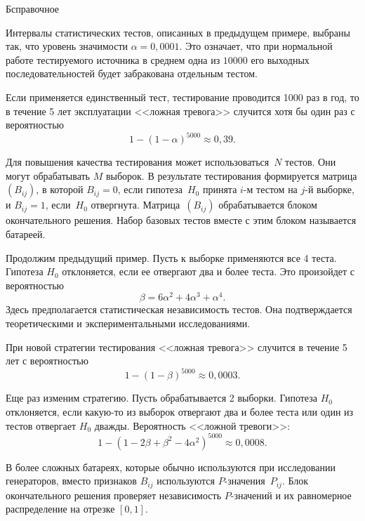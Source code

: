 \begin{appendix}{Б}{справочное}
\begin{example}
Интервалы статистических тестов, описанных в предыдущем примере,
выбраны так, что уровень значимости $\alpha=0,0001$.
%
Это означает, что при нормальной работе тестируемого источника
в среднем одна из $10000$ его выходных последовательностей
будет забракована отдельным тестом. 

Если применяется единственный тест,
тестирование проводится 1000 раз в год, 
то в течение 5 лет эксплуатации <<ложная тревога>>
случится хотя бы один раз с вероятностью
$$
1-(1-\alpha)^{5000}\approx 0,39.
$$
\end{example}

Для повышения качества тестирования может использоваться~$N$ 
тестов. Они могут обрабатывать $M$ выборок. В результате
тестирования формируется матрица $(B_{ij})$, в которой $B_{ij}=0$,
если гипотеза~$H_0$ принята $i$-м тестом на $j$-й выборке,
и $B_{ij}=1$, если~$H_0$ отвергнута.
%
Матрица~$(B_{ij})$ обрабатывается блоком окончательного решения. 
Набор базовых тестов вместе с этим блоком называется батареей.

\begin{example}
Продолжим предыдущий пример. Пусть к выборке применяются 
все 4 теста. Гипотеза $H_0$ отклоняется, если ее отвергают 
два и более теста. Это произойдет с вероятностью
$$
\beta=6\alpha^2 + 4 \alpha^3 + \alpha^4.
$$
Здесь предполагается статистическая независимость тестов.
Она подтверждается теоретическими и экспериментальными 
исследованиями.

При новой стратегии тестирования <<ложная тревога>>
случится в течение 5 лет с вероятностью
$$
1-(1-\beta)^{5000}\approx 0,0003.
$$

Еще раз изменим стратегию. Пусть обрабатывается 2 выборки.
Гипотеза $H_0$ отклоняется, если какую-то из выборок отвергают 
два и более теста или один из тестов отвергает $H_0$ дважды.
%
Вероятность <<ложной тревоги>>:
$$
1-(1-2\beta+\beta^2-4\alpha^2)^{5000}\approx 0,0008.
$$
\end{example}

В более сложных батареях, которые обычно используются при исследовании
генераторов, вместо признаков $B_{ij}$ используются $P$-значения~$P_{ij}$.
%
Блок окончательного решения проверяет независимость $P$-значений
и их равномерное распределение на отрезке $[0,1]$.

\end{appendix}
